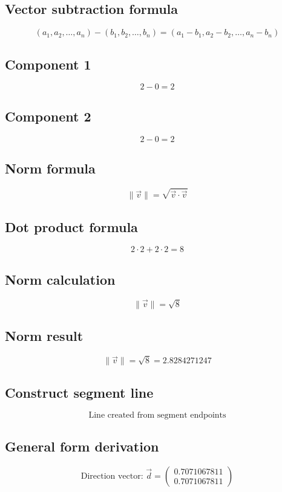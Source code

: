 \documentclass{article}
\begin{document}
\subsection*{ \vspace{1em} Vector subtraction formula}
\[
(a_1, a_2, \dots, a_n) - (b_1, b_2, \dots, b_n) = (a_1 - b_1, a_2 - b_2, \dots, a_n - b_n)
\]
\subsection*{ \vspace{1em} Component 1}
\[
2 - 0 = 2
\]
\subsection*{ \vspace{1em} Component 2}
\[
2 - 0 = 2
\]
\subsection*{ \vspace{1em} Norm formula}
\[
\|\vec{v}\| = \sqrt{\vec{v} \cdot \vec{v}}
\]
\subsection*{ \vspace{1em} Dot product formula}
\[
2 \cdot 2 + 2 \cdot 2 = 8
\]
\subsection*{ \vspace{1em} Norm calculation}
\[
\|\vec{v}\| = \sqrt{8}
\]
\subsection*{ \vspace{1em} Norm result}
\[
\|\vec{v}\| = \sqrt{8} = 2.8284271247
\]
\subsection*{ \vspace{1em} Construct segment line}
\[
\text{Line created from segment endpoints}
\]
\subsection*{ \vspace{1em} General form derivation}
\[
\text{Direction vector: } \vec{d} = \begin{pmatrix}0.7071067811 \\ 0.7071067811\end{pmatrix}
\]
\end{document}
